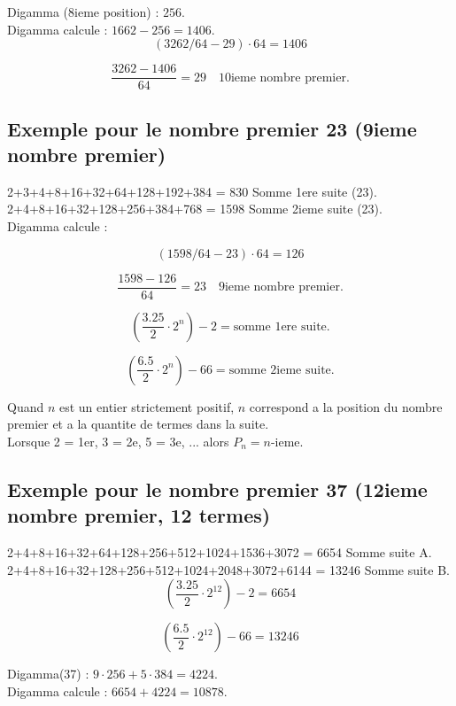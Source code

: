 \documentclass[a4paper,11pt]{article}
\begin{document}
Digamma (8ieme position) : \(256\).\\
Digamma calcule : \(1662 - 256 = 1406\).\\

\[
(3262/64 - 29) \cdot 64 = 1406
\]

\[
\frac{3262 - 1406}{64} = 29 \quad \text{10ieme nombre premier.}
\]

\bigskip

\subsection*{Exemple pour le nombre premier 23 (9ieme nombre premier)}

2+3+4+8+16+32+64+128+192+384 = 830 Somme 1ere suite (23).\\
2+4+8+16+32+128+256+384+768 = 1598 Somme 2ieme suite (23).\\

Digamma calcule :

\[
(1598/64 - 23) \cdot 64 = 126
\]

\[
\frac{1598 - 126}{64} = 23 \quad \text{9ieme nombre premier.}
\]

\[
\left(\frac{3.25}{2} \cdot 2^{n}\right) - 2 = \text{somme 1ere suite.}
\]

\[
\left(\frac{6.5}{2} \cdot 2^{n}\right) - 66 = \text{somme 2ieme suite.}
\]

Quand \(n\) est un entier strictement positif, \(n\) correspond a la position du nombre premier et a la quantite de termes dans la suite.\\
Lorsque 2 = 1er, 3 = 2e, 5 = 3e, ... alors \(P_{n} = n\)-ieme.

\bigskip

\subsection*{Exemple pour le nombre premier 37 (12ieme nombre premier, 12 termes)}

2+4+8+16+32+64+128+256+512+1024+1536+3072 = 6654 Somme suite A.\\
2+4+8+16+32+128+256+512+1024+2048+3072+6144 = 13246 Somme suite B.\\

\[
\left(\frac{3.25}{2} \cdot 2^{12}\right) - 2 = 6654
\]

\[
\left(\frac{6.5}{2} \cdot 2^{12}\right) - 66 = 13246
\]

Digamma(37) : \(9 \cdot 256 + 5 \cdot 384 = 4224\).\\
Digamma calcule : \(6654 + 4224 = 10878\).\\
\end{document}
